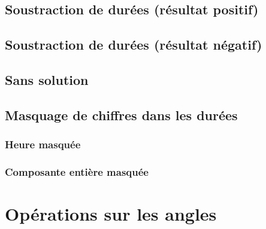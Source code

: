 \documentclass[11pt,a4paper]{article}
\begin{document}



\subsection{Soustraction de durées (résultat positif)}



\subsection{Soustraction de durées (résultat négatif)}


\subsection{Sans solution}


\subsection{Masquage de chiffres dans les durées}

\subsubsection{Heure masquée}

\begin{center}
\end{center}

\subsubsection{Composante entière masquée}

\begin{center}
\end{center}

\section{Opérations sur les angles}
\end{document}
